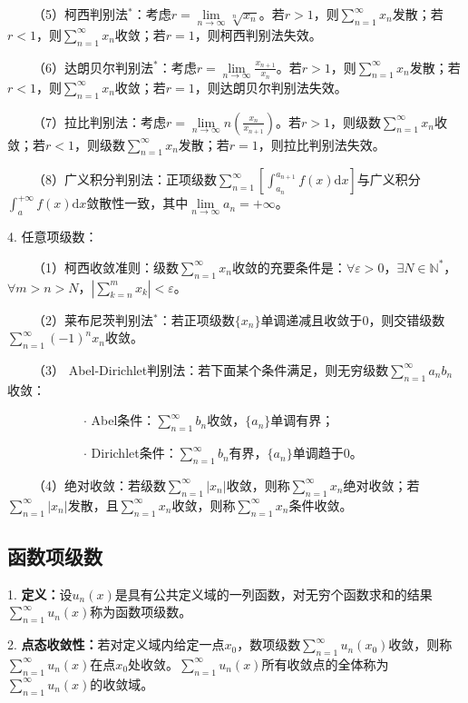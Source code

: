 ~~~~（5）柯西判别法$^*$：考虑$r=\lim\limits_{n\rightarrow\infty}\sqrt[n]{x_n}$。若$r>1$，则$\sum\limits_{n=1}^\infty x_n$发散；若$r<1$，则$\sum\limits_{n=1}^\infty x_n$收敛；若$r=1$，则柯西判别法失效。

~~~~（6）达朗贝尔判别法$^*$：考虑$r=\lim\limits_{n\rightarrow\infty}\frac{x_{n+1}}{x_n}$。若$r>1$，则$\sum\limits_{n=1}^\infty x_n$发散；若$r<1$，则$\sum\limits_{n=1}^\infty x_n$收敛；若$r=1$，则达朗贝尔判别法失效。

~~~~（7）拉比判别法：考虑$r=\lim\limits_{n\rightarrow\infty}n\left(\frac{x_n}{x_{n+1}}\right)$。若$r>1$，则级数$\sum\limits_{n=1}^\infty x_n$收敛；若$r<1$，则级数$\sum\limits_{n=1}^\infty x_n$发散；若$r=1$，则拉比判别法失效。

~~~~（8）广义积分判别法：正项级数$\sum\limits_{n=1}^\infty \left[\int_{a_n}^{a_{n+1}}f(x)\mathrm{d}x\right]$与广义积分$\int_a^{+\infty}f(x)\mathrm{d}x$敛散性一致，其中$\lim\limits_{n\rightarrow\infty} a_n=+\infty$。

4. 任意项级数：

~~~~（1）柯西收敛准则：级数$\sum\limits_{n=1}^\infty x_n$收敛的充要条件是：$\forall \varepsilon>0$，$\exists N \in \mathbb{N}^*$，$\forall m>n>N$，$\left|\sum\limits_{k=n}^m x_k\right|<\varepsilon$。

~~~~（2）莱布尼茨判别法$^*$：若正项级数$\{x_n\}$单调递减且收敛于$0$，则交错级数$\sum\limits_{n=1}^\infty (-1)^n x_n$收敛。

~~~~（3） Abel-Dirichlet判别法：若下面某个条件满足，则无穷级数$\sum\limits_{n=1}^\infty a_nb_n$收敛：

~~~~~~~~~~~~$\cdot$ Abel条件：$\sum\limits_{n=1}^\infty b_n$收敛，$\{a_n\}$单调有界；

~~~~~~~~~~~~$\cdot$ Dirichlet条件：$\sum\limits_{n=1}^\infty b_n$有界，$\{a_n\}$单调趋于$0$。

~~~~（4）绝对收敛：若级数$\sum\limits_{n=1}^\infty \left|x_n\right|$收敛，则称$\sum\limits_{n=1}^\infty x_n$绝对收敛；若$\sum\limits_{n=1}^\infty \left|x_n\right|$发散，且$\sum\limits_{n=1}^\infty x_n$收敛，则称$\sum\limits_{n=1}^\infty x_n$条件收敛。

\subsection{函数项级数}

1. \textbf{定义：}设$u_n(x)$是具有公共定义域的一列函数，对无穷个函数求和的结果$\sum\limits_{n=1}^{\infty} u_n(x)$称为函数项级数。

2. \textbf{点态收敛性：}若对定义域内给定一点$x_0$，数项级数$\sum\limits_{n=1}^{\infty} u_n(x_0)$收敛，则称$\sum\limits_{n=1}^{\infty} u_n(x)$在点$x_0$处收敛。$\sum\limits_{n=1}^{\infty} u_n(x)$所有收敛点的全体称为$\sum\limits_{n=1}^{\infty} u_n(x)$的收敛域。

